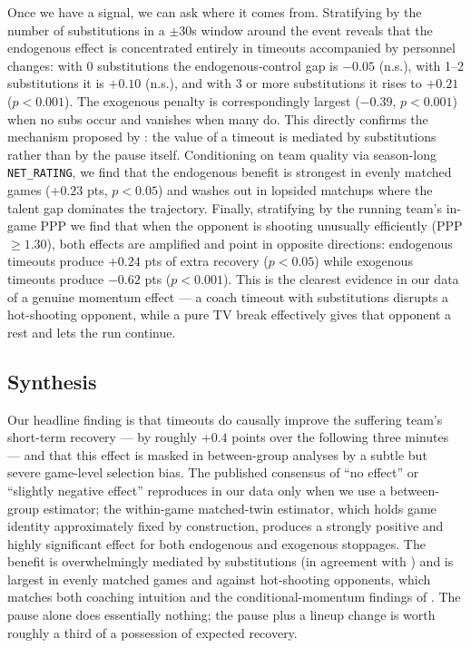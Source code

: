 \documentclass[twoside,11pt]{article}
\begin{document}
Once we have a signal, we can ask where it comes from. Stratifying by the number of substitutions in a
$\pm 30$s window around the event reveals that the endogenous effect is concentrated entirely in timeouts
accompanied by personnel changes: with 0 substitutions the endogenous-control gap is $-0.05$ (n.s.), with
1--2 substitutions it is $+0.10$ (n.s.), and with 3 or more substitutions it rises to $+0.21$
($p < 0.001$). The exogenous penalty is correspondingly largest ($-0.39$, $p < 0.001$) when no subs occur
and vanishes when many do. This directly confirms the mechanism proposed by \citet{weimer2023causal}: the
value of a timeout is mediated by substitutions rather than by the pause itself. Conditioning on team quality
via season-long \texttt{NET\_RATING}, we find that the endogenous benefit is strongest in evenly matched
games ($+0.23$ pts, $p < 0.05$) and washes out in lopsided matchups where the talent gap dominates the
trajectory. Finally, stratifying by the running team's in-game PPP we find that when the opponent is shooting
unusually efficiently (PPP $\geq 1.30$), both effects are amplified and point in opposite directions:
endogenous timeouts produce $+0.24$ pts of extra recovery ($p < 0.05$) while exogenous timeouts produce
$-0.62$ pts ($p < 0.001$). This is the clearest evidence in our data of a genuine momentum effect --- a coach
timeout with substitutions disrupts a hot-shooting opponent, while a pure TV break effectively gives that
opponent a rest and lets the run continue.

\subsection{Synthesis}

Our headline finding is that timeouts do causally improve the suffering team's short-term recovery --- by
roughly $+0.4$ points over the following three minutes --- and that this effect is masked in between-group
analyses by a subtle but severe game-level selection bias. The published consensus of ``no effect'' or
``slightly negative effect'' \citep{assis2020stop,gibbs2021causal} reproduces in our data only when we use a
between-group estimator; the within-game matched-twin estimator, which holds game identity approximately
fixed by construction, produces a strongly positive and highly significant effect for both endogenous and
exogenous stoppages. The benefit is overwhelmingly mediated by substitutions (in agreement with
\citet{weimer2023causal}) and is largest in evenly matched games and against hot-shooting opponents, which
matches both coaching intuition and the conditional-momentum findings of \citet{qiu2025interrupt}. The pause
alone does essentially nothing; the pause plus a lineup change is worth roughly a third of a possession of
expected recovery.
\end{document}
